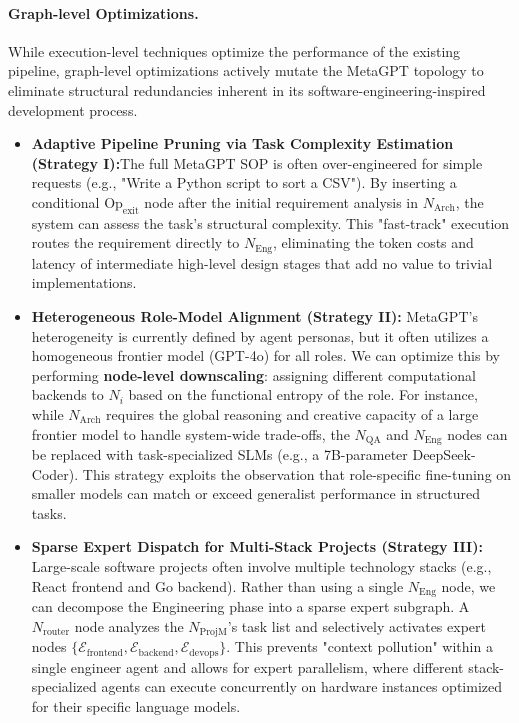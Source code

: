 \paragraph{Graph-level Optimizations.}
While execution-level techniques optimize the performance of the existing pipeline, graph-level optimizations actively mutate the MetaGPT topology to eliminate structural redundancies inherent in its software-engineering-inspired development process. 
\begin{itemize}
    \item \textbf{Adaptive Pipeline Pruning via Task Complexity Estimation (Strategy I):}The full MetaGPT SOP is often over-engineered for simple requests (e.g., "Write a Python script to sort a CSV"). By inserting a conditional $\text{Op}_{\text{exit}}$ node after the initial requirement analysis in $N_{\text{Arch}}$, the system can assess the task's structural complexity. This "fast-track" execution routes the requirement directly to $N_{\text{Eng}}$, eliminating the token costs and latency of intermediate high-level design stages that add no value to trivial implementations.
    \item \textbf{Heterogeneous Role-Model Alignment (Strategy II):} MetaGPT's heterogeneity is currently defined by agent personas, but it often utilizes a homogeneous frontier model (GPT-4o) for all roles. We can optimize this by performing \textbf{node-level downscaling}: assigning different computational backends to $N_i$ based on the functional entropy of the role. For instance, while $N_{\text{Arch}}$ requires the global reasoning and creative capacity of a large frontier model to handle system-wide trade-offs, the $N_{\text{QA}}$ and $N_{\text{Eng}}$ nodes can be replaced with task-specialized SLMs (e.g., a 7B-parameter DeepSeek-Coder). This strategy exploits the observation that role-specific fine-tuning on smaller models can match or exceed generalist performance in structured tasks.
    \item \textbf{Sparse Expert Dispatch for Multi-Stack Projects (Strategy III):} Large-scale software projects often involve multiple technology stacks (e.g., React frontend and Go backend). Rather than using a single $N_{\text{Eng}}$ node, we can decompose the Engineering phase into a sparse expert subgraph. A $N_{\text{router}}$ node analyzes the $N_{\text{ProjM}}$'s task list and selectively activates expert nodes $\{\mathcal{E}_{\text{frontend}}, \mathcal{E}_{\text{backend}}, \mathcal{E}_{\text{devops}}\}$. This prevents "context pollution" within a single engineer agent and allows for expert parallelism, where different stack-specialized agents can execute concurrently on hardware instances optimized for their specific language models.
\end{itemize}

